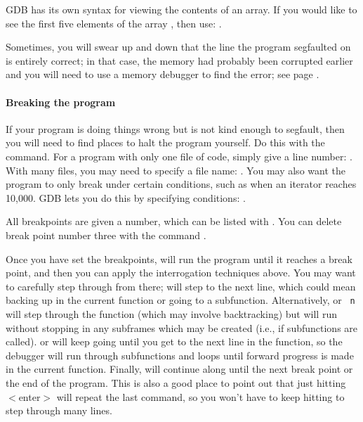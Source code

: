 GDB has its own syntax for viewing the contents of an array. If you
would like to see the first five elements of the array ,
then use: .

Sometimes, you will swear up and down that the line the program segfaulted on is
entirely correct; in that case, the memory had probably been corrupted
earlier and you will need to use a memory debugger to find the error;
see page \pageref{valgrind}.

\paragraph{Breaking the program} If your program is doing things wrong but is not kind
enough to segfault, then you will need to find places to halt the program
yourself. Do this with the  command. For a program with only
one file of code, simply give a line number: . With many
files, you may need to specify a file name: . You
may also want the program to only break under certain conditions, such
as when an iterator reaches 10,000. GDB lets you do this by specifying
conditions: .

All breakpoints are given a number, which can be listed with
. You can delete break point number three with
the command .

Once you have set the breakpoints,  will run the program until it
reaches a break point, and then you can apply the interrogation techniques
above. You may want to carefully step through from there; 
will step to the next line, which could mean backing up in the current
function or going to a subfunction. Alternatively,  or {\tt
n} will step through the function (which may involve backtracking) but
will run without stopping in any subframes which may be created
(i.e., if subfunctions are called).   or  will keep
going until you get to the next line in the function, so the debugger
will run through subfunctions and loops until forward progress is made
in the current function.  Finally,  will continue along until the next
break point or the end of the program. This is also a good place to
point out that just hitting $<$enter$>$ will repeat the last command,
so you won't have to keep hitting  to step through many lines.


